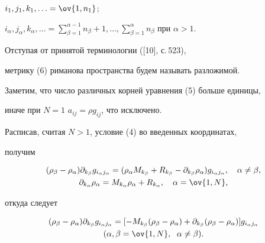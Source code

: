 $i_1,j_1,k_1,\dotsc=\ov{1,n_1}$; 


$i_\alpha,j_\alpha,k_\alpha,\dotsc=\sum\limits^{\alpha-1}_{\beta=1} 


n_\beta+1,\dotsc,\sum\limits^\alpha_{\beta=1}n_\beta$ при $\alpha>1$. 


 


\noindent{}Отступая от принятой терминологии ([10], с.\,523), 


метрику (6) риманова пространства будем называть разложимой. 


 


Заметим, что число различных корней уравнения (5) больше единицы, 


иначе при $N=1$\; $a_{ij}=\rho g_{ij}$, что исключено.


 


Расписав, считая $N>1$, условие (4) во введенных координатах, 


получим 


\begin{gather*} 


(\rho_\beta-\rho_\alpha)\partial_{k_\beta} 


g_{i_\alpha j_\alpha}=(\rho_\alpha M_{k_\beta}+ 


R_{k_\beta}-\partial_{k_\beta}\rho_\alpha) 


g_{i_\alpha j_\alpha},\quad \alpha\ne\beta, \\ 


% 


\partial_{k_\alpha}\rho_\alpha=M_{k_\alpha}\rho_\alpha+R_{k_\alpha}, 


\quad \alpha=\ov{1,N}, 


\end{gather*} 


откуда следует


\begin{gather} 


(\rho_\beta-\rho_\alpha)\partial_{k_\beta}g_{i_\alpha j_\alpha} 


=[-M_{k_\beta}(\rho_\beta-\rho_\alpha)+ 


\partial_{k_\beta}(\rho_\beta-\rho_\alpha)] 


g_{i_\alpha j_\alpha} \\ 


% 


(\alpha,\beta=\ov{1,N},\ \; \alpha\ne\beta).\notag 


\end{gather} 


